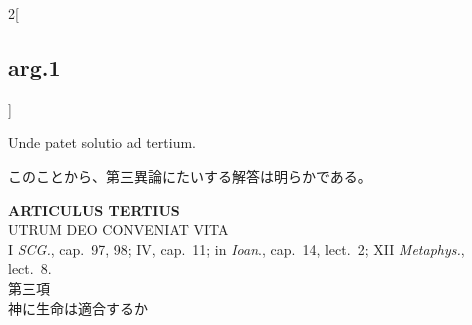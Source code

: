 \documentclass[paper=a4paper,fontsize=10pt,jafontsize=9pt,titlepage]{jlreq}
\begin{document}
\begin{paracol}{2}[\subsection{arg.1}]
\switchcolumn*


Unde patet solutio ad tertium.

\switchcolumn

このことから、第三異論にたいする解答は明らかである。

\end{paracol}
\newpage

{}
\setcounter{section}{3}
\setcounter{subsection}{0}
\begin{center}
 {\Large {\bfseries ARTICULUS TERTIUS}}\\
 {\large UTRUM DEO CONVENIAT VITA}\\
 {\footnotesize I {\itshape SCG.}, cap.~97, 98; IV, cap.~11; in
 {\itshape Ioan}., cap.~14, lect.~2; XII {\itshape Metaphys.}, lect.~8.}\\
 {\Large 第三項\\神に生命は適合するか}
\end{center}
\end{document}
